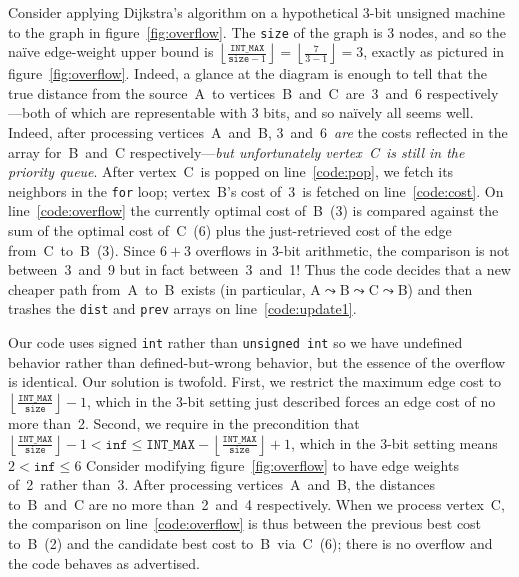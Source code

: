 Consider applying Dijkstra's algorithm on a hypothetical 3-bit unsigned machine to 
the graph in figure~\ref{fig:overflow}.  The \texttt{size} of the graph is 3 nodes, and so the na\"ive edge-weight upper bound is $\left\lfloor\frac{\texttt{INT\_MAX}}{\texttt{size}-1}\right\rfloor = \left\lfloor\frac{7}{3-1}\right\rfloor = 3$, exactly as pictured in figure~\ref{fig:overflow}.  Indeed, a glance at the diagram is enough to tell that the true distance from the source~A~to vertices~B~and~C~are~3~and~6 respectively---both of which are representable with 3 bits, and so na\"ively all seems well.  %
Indeed, after processing vertices~A~and~B, 3~and~6~\emph{are} the costs reflected in the  array for~B~and~C respectively---\emph{but unfortunately vertex~C~is still in the priority queue}.  After vertex~C~is popped on line~\ref{code:pop}, we fetch its neighbors in the \texttt{for} loop; vertex~B's cost of~3~is fetched on line~\ref{code:cost}.  On line~\ref{code:overflow} the currently optimal cost of~B~(3) is compared against the sum of the optimal cost of~C~(6) plus the just-retrieved cost of the edge from~C~to~B~(3).  Since $6+3$ overflows in 3-bit arithmetic, the comparison is not between~3~and~9 but in fact between~3~and~1!  Thus the code decides that a new cheaper path from~A~to~B~exists (in particular, A$\leadsto$B$\leadsto$C$\leadsto$B) and then trashes the \texttt{dist} and \texttt{prev} arrays on line~\ref{code:update1}.

Our code uses signed \texttt{int} rather than \texttt{unsigned int} so we have undefined behavior rather than defined-but-wrong behavior, but the essence of the overflow is identical.
Our solution is twofold.  First, we restrict the maximum edge cost to $\left\lfloor\frac{\texttt{INT\_MAX}}{\texttt{size}}\right\rfloor - 1$, which in the 3-bit setting just described forces an edge cost of no more than~2.  Second, we require in the precondition that 
$\left\lfloor \frac{\texttt{INT\_MAX}}{\texttt{size}} \right\rfloor - 1 < \texttt{inf} \le \texttt{INT\_MAX} - \left\lfloor \frac{\texttt{INT\_MAX}}{\texttt{size}} \right\rfloor + 1$, which in the 3-bit setting means $2 < \texttt{inf} \le 6$ 
Consider modifying figure~\ref{fig:overflow} to
have edge weights of~2~rather than~3.  After processing vertices~A~and~B, the distances to~B~and~C are no more than~2~and~4 respectively.  When we process vertex~C, the comparison on line~\ref{code:overflow} is thus between the previous best cost to~B~(2) and the candidate best cost to~B~via~C~(6); there is no overflow and the code behaves as advertised.

